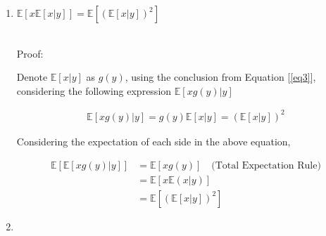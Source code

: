 \documentclass[a4paper]{article}
\begin{document}
\begin{enumerate}
\begin{enumerate}
\begin{enumerate}
      \item  $\mathbb{E}[x\mathbb{E}[x|y]]=\mathbb{E}\left[(\mathbb{E}[x | y])^{2}\right]$
      \\~

      Proof:

      Denote $\mathbb{E}[x|y]$ as $g(y)$, using the conclusion from Equation [\ref{eq3}], considering the following expression $\mathbb{E}[xg(y)|y]$

      \begin{equation}
        \begin{aligned}
          \mathbb{E}[xg(y)|y ] =  g(y) \mathbb{E}[x|y] = (\mathbb{E}[x|y])^2
        \end{aligned}
      \end{equation}

      Considering the expectation of each side in the above equation,

      \begin{equation}
        \begin{aligned}
          \mathbb{E}[\mathbb{E}[xg(y)|y ] ] & = \mathbb{E}[xg(y)] \quad \text{(Total Expectation Rule)}  \\
          & = \mathbb{E}[x\mathbb{E}(x|y)] \\
          & = \mathbb{E}[{(\mathbb{E}[x|y])^2}]
        \end{aligned}
      \end{equation}

    \item 

    




      \end{enumerate}
    \end{enumerate}
    

\end{enumerate}
\end{document}
